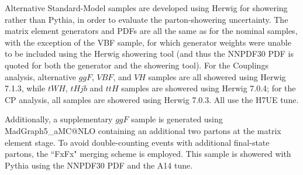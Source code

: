 Alternative Standard-Model samples are developed using Herwig for showering rather than Pythia, in order to evaluate the parton-showering uncertainty. The matrix element generators and PDFs are all the same as for the nominal samples, with the exception of the VBF sample, for which generator weights were unable to be included using the Herwig showering tool (and thus the NNPDF30 PDF is quoted for both the generator and the showering tool). For the Couplings analysis, alternative $ggF$, $VBF$, and $VH$ samples are all showered using Herwig 7.1.3, while $tWH$, $tHjb$ and $ttH$ samples are showered using Herwig 7.0.4; for the CP analysis, all samples are showered using Herwig 7.0.3. All use the H7UE tune.

Additionally, a supplementary $ggF$ sample is generated using {MadGraph5\_aMC@NLO} containing an additional two partons at the matrix element stage. To avoid double-counting events with additional final-state partons, the ``FxFx" merging scheme is employed. This sample is showered with Pythia using the NNPDF30 PDF and the A14 tune.
 
\begin{table}[h!]
  \centering
  \caption{Summary of alternative signal samples}
  \label{tab:signal_samples_herwig}
\end{table}  

